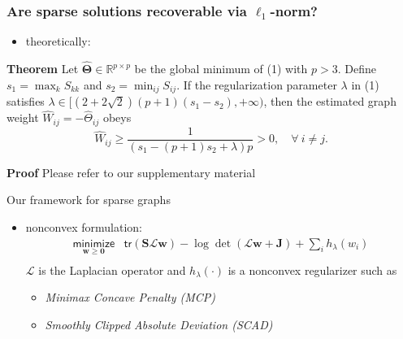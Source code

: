 \documentclass[aspectratio=169]{beamer}
\begin{document}
                \begin{frame}
                \frametitle{Are sparse solutions recoverable via $\ell_1$-norm?}
                \vspace{.4cm}
                \begin{itemize}
                  \item theoretically:
                \end{itemize}
                \begin{block}{\textbf{Theorem}}
                  Let $\hat{\bm{\Theta}} \in \mathbb{R}^{p \times p}$ be the global minimum of (1) with $p>3$. Define $s_1 = \max_k S_{kk}$ and $s_2 = \min_{ij} S_{ij}$. If the regularization parameter $\lambda$ in (1) satisfies $\lambda \in [ (2+2\sqrt{2})(p+1)(s_1 - s_2), + \infty)$, then the estimated graph weight $\hat{W}_{ij} = - \hat{\Theta}_{ij}$ obeys
\begin{equation}
  \hat{W}_{ij} \geq \frac{1}{(s_1 - (p+1) s_2 + \lambda ) p } >0, \quad \forall \ i \neq j.  \nonumber
\end{equation}
                \end{block}
                \begin{block}{\textbf{Proof}}
                  Please refer to our supplementary material \Laughey
                \end{block}
                \end{frame}

                \begin{frame}{Our framework for sparse graphs}
                  \begin{itemize}
                    \item nonconvex formulation:
                  \begin{equation}
                     \begin{array}{ll}
                       \underset{\bm{w} \geq \mathbf{0}}{\textsf{minimize}} & \mathsf{tr}({\bm{S} \mathcal{L} \bm w })
                       - \log {\det}(\mathcal{L} \bm{w} + \bm{J})
                        + \sum_{i} h_{\lambda} (w_i)\\
                      \end{array}
                 \end{equation}
                 $\mathcal{L}$ is the Laplacian operator and $h_\lambda(\cdot)$ is a nonconvex regularizer such as
                 \begin{itemize}
                   \item {\color{purple}\textit{Minimax Concave Penalty (MCP)}}
                   \item {\color{purple}\textit{Smoothly Clipped Absolute Deviation (SCAD)}}
                   \end{itemize}
                 \end{itemize}
                \end{frame}
\end{document}
